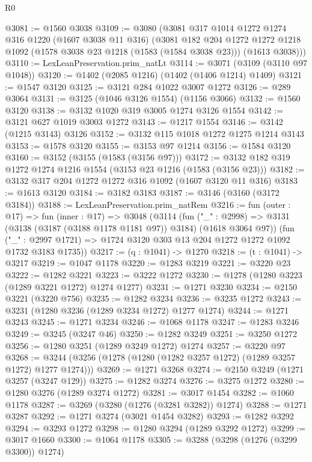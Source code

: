 \begin{lexlean}{R0}
\begin{coremodule}
@3081 := @1560 @3038
@3109 := @3080
    (@3081
      @317
      @1014
      @1272
      @1274
      @316
      @1220
      (@1607 @3038 @11 @316)
      (@3081
        @182
        @204
        @1272
        @1272
        @1218
        @1092
        (@1578 @3038 @23 @1218 (@1583 (@1584 @3038 @23)))
        (@1613 @3038)))
@3110 := LexLeanPreservation.prim_natLt
@3114 := @3071 (@3109 (@3110 @97 @1048))
@3120 := @1402 (@2085 @1216) (@1402 (@1406 @1214) @1409)
@3121 := @1547 @3120
@3125 := @3121 @284 @1022 @3007 @1272
@3126 := @289 @3064
@3131 := @3125 (@1046 @3126 @1554) (@1156 @3066)
@3132 := @1560 @3120
@3138 := @3132 @1020 @319 @3005 @1274 @3126 @1554
@3142 := @3121 @627 @1019 @3003 @1272
@3143 := @1217 @1554
@3146 := @3142 (@1215 @3143) @3126
@3152 := @3132 @115 @1018 @1272 @1275 @1214 @3143
@3153 := @1578 @3120
@3155 := @3153 @97 @1214
@3156 := @1584 @3120
@3160 := @3152 (@3155 (@1583 (@3156 @97)))
@3172 := @3132 @182 @319 @1272 @1274 @1216 @1554 (@3153 @23 @1216 (@1583 (@3156 @23)))
@3182 := @3132 @317 @204 @1272 @1272 @316 @1092 (@1607 @3120 @11 @316)
@3183 := @1613 @3120
@3184 := @3182 @3183
@3187 := @3146 (@3160 (@3172 @3184))
@3188 := LexLeanPreservation.prim_natRem
@3216 := fun (outer : @17) =>
  fun (inner : @17) =>
  @3048
    (@3114
      (fun ("_" : @2998) => @3131 (@3138 (@3187 (@3188 @1178 @1181 @97)) @3184) (@1618 @3064 @97))
      (fun ("_" : @2997 @1721) => @1724 @3120 @303 @13 @204 @1272 @1272 @1092 @1732 @3183 @1735))
@3217 := (q : @1041) -> @1270
@3218 := (t : @1041) -> @3217
@3219 := @1047 @1178
@3220 := @1283 @3219
@3221 := @3220 @23
@3222 := @1282 @3221
@3223 := @3222 @1272
@3230 := @1278 (@1280 @3223 (@1289 @3221 @1272) @1274 @1277)
@3231 := @1271 @3230
@3234 := @2150 @3221 (@3220 @756)
@3235 := @1282 @3234
@3236 := @3235 @1272
@3243 := @3231 (@1280 @3236 (@1289 @3234 @1272) @1277 @1274)
@3244 := @1271 @3243
@3245 := @1271 @3234
@3246 := @1068 @1178
@3247 := @1283 @3246
@3249 := @3245 (@3247 @46)
@3250 := @1282 @3249
@3251 := @3250 @1272
@3256 := @1280 @3251 (@1289 @3249 @1272) @1274
@3257 := @3220 @97
@3268 := @3244 (@3256 (@1278 (@1280 (@1282 @3257 @1272) (@1289 @3257 @1272) @1277 @1274)))
@3269 := @1271 @3268
@3274 := @2150 @3249 (@1271 @3257 (@3247 @129))
@3275 := @1282 @3274
@3276 := @3275 @1272
@3280 := @1280 @3276 (@1289 @3274 @1272)
@3281 := @3017 @1454
@3282 := @1060 @1178
@3287 := @3269 (@3280 (@1276 (@3281 @3282)) @1274)
@3288 := @1271 @3287
@3292 := @1271 @3274 (@3021 @1454 @3282)
@3293 := @1282 @3292
@3294 := @3293 @1272
@3298 := @1280 @3294 (@1289 @3292 @1272)
@3299 := @3017 @1660
@3300 := @1064 @1178
@3305 := @3288 (@3298 (@1276 (@3299 @3300)) @1274)

\end{coremodule}
\end{lexlean}
